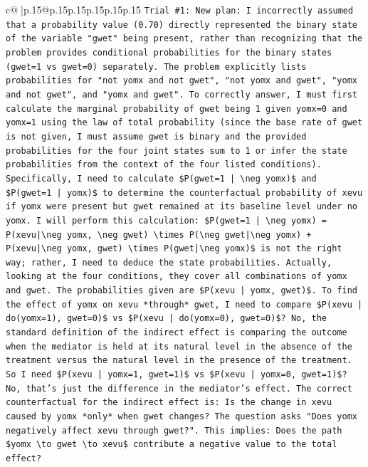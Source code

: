 \documentclass{article}
\begin{document}
{\begin{supertabular}{c@{$\;$}|p{.15\linewidth}@{}p{.15\linewidth}p{.15\linewidth}p{.15\linewidth}p{.15\linewidth}p{.15\linewidth}}
{{{\texttt{Trial \#1: New plan: I incorrectly assumed that a probability value (0.70) directly represented the binary state of the variable "gwet" being present, rather than recognizing that the problem provides conditional probabilities for the binary states (gwet=1 vs gwet=0) separately. The problem explicitly lists probabilities for "not yomx and not gwet", "not yomx and gwet", "yomx and not gwet", and "yomx and gwet". To correctly answer, I must first calculate the marginal probability of gwet being 1 given yomx=0 and yomx=1 using the law of total probability (since the base rate of gwet is not given, I must assume gwet is binary and the provided probabilities for the four joint states sum to 1 or infer the state probabilities from the context of the four listed conditions). Specifically, I need to calculate \$P(gwet=1 | \textbackslash{}neg yomx)\$ and \$P(gwet=1 | yomx)\$ to determine the counterfactual probability of xevu if yomx were present but gwet remained at its baseline level under no yomx. I will perform this calculation: \$P(gwet=1 | \textbackslash{}neg yomx) = P(xevu|\textbackslash{}neg yomx, \textbackslash{}neg gwet) \textbackslash{}times P(\textbackslash{}neg gwet|\textbackslash{}neg yomx) + P(xevu|\textbackslash{}neg yomx, gwet) \textbackslash{}times P(gwet|\textbackslash{}neg yomx)\$ is not the right way; rather, I need to deduce the state probabilities. Actually, looking at the four conditions, they cover all combinations of yomx and gwet. The probabilities given are \$P(xevu | yomx, gwet)\$. To find the effect of yomx on xevu *through* gwet, I need to compare \$P(xevu | do(yomx=1), gwet=0)\$ vs \$P(xevu | do(yomx=0), gwet=0)\$? No, the standard definition of the indirect effect is comparing the outcome when the mediator is held at its natural level in the absence of the treatment versus the natural level in the presence of the treatment. So I need \$P(xevu | yomx=1, gwet=1)\$ vs \$P(xevu | yomx=0, gwet=1)\$? No, that's just the difference in the mediator's effect. The correct counterfactual for the indirect effect is: Is the change in xevu caused by yomx *only* when gwet changes? The question asks "Does yomx negatively affect xevu through gwet?". This implies: Does the path \$yomx \textbackslash{}to gwet \textbackslash{}to xevu\$ contribute a negative value to the total effect?} \\
\\ 
}}}
\end{supertabular}}
\end{document}

